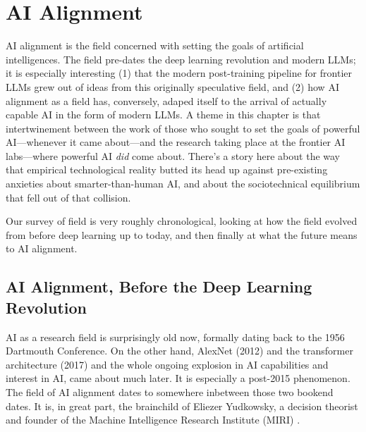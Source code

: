 \chapter{AI Alignment}\label{ch_ai_alignment}

AI alignment is the field concerned with setting the goals of artificial
intelligences. The field pre-dates the deep learning revolution and modern
LLMs; it is especially interesting (1) that the modern post-training pipeline
for frontier LLMs grew out of ideas from this originally speculative field, and
(2) how AI alignment as a field has, conversely, adaped itself to the arrival
of actually capable AI in the form of modern LLMs. A theme in this chapter is
that intertwinement between the work of those who sought to set the goals of
powerful AI---whenever it came about---and the research taking place at the
frontier AI labs---where powerful AI \emph{did} come about. There's a story
here about the way that empirical technological reality butted its head up
against pre-existing anxieties about smarter-than-human AI, and about the
sociotechnical equilibrium that fell out of that collision.

Our survey of field is very roughly chronological, looking at how the field
evolved from before deep learning up to today, and then finally at what the
future means to AI alignment.

\section{AI Alignment, Before the Deep Learning Revolution}
AI as a research field is surprisingly old now, formally dating back to the
1956 Dartmouth Conference. On the other hand, AlexNet (2012)
\cite{krizhevsky2012imagenet} and the transformer architecture (2017)
\cite{vaswani2017attention} and the whole ongoing explosion in AI capabilities
and interest in AI, came about much later. It is especially a post-2015
phenomenon. The field of AI alignment dates to somewhere inbetween those two
bookend dates. It is, in great part, the brainchild of Eliezer Yudkowsky, a
decision theorist and founder of the Machine Intelligence Research Institute
(MIRI) \cite{yudkowsky2008factor}.

